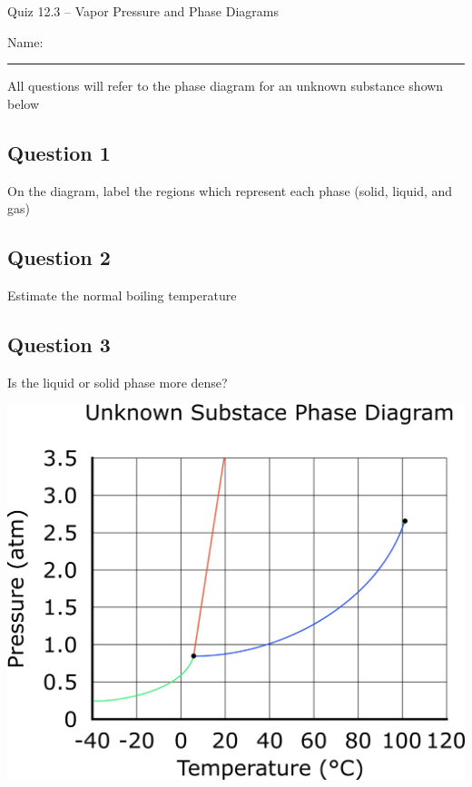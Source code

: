 \documentclass[11pt, letterpaper]{memoir}
\begin{document}
	\begin{center}
		{\large	Quiz 12.3 -- Vapor Pressure and Phase Diagrams}
	\end{center}
	{\large Name: \rule[-1mm]{4in}{.1pt} 
	
	\begin{center}	
	All questions will refer to the phase diagram for an unknown substance shown below
	\end{center}
	
	\noindent
	\begin{minipage}[T]{0.49\textwidth}
		\subsection*{Question 1}
		On the diagram, label the regions which represent each phase (solid, liquid, and gas)
		
		\subsection*{Question 2}
		Estimate the normal boiling temperature
		
		\hspace{1em}
		\subsection*{Question 3}
		Is the liquid or solid phase more dense?
		
	\end{minipage} \hspace{1em}
	\begin{minipage}[T]{0.49\textwidth}
		\includegraphics[width=\textwidth]{Phase_Diagram}
	\end{minipage}

}
\end{document}

